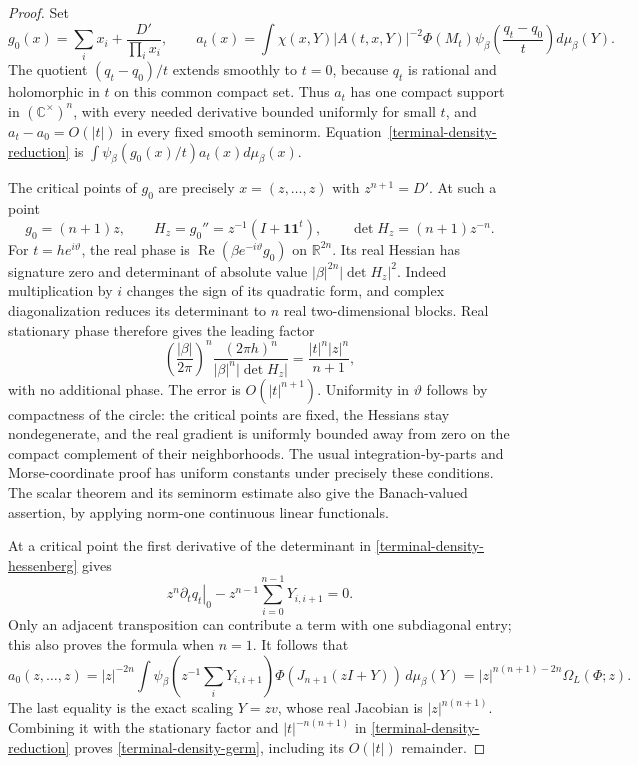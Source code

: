 \begin{proof}
Set
\[
 g_0(x)=\sum_i x_i+\frac{D'}{\prod_i x_i},\qquad
 a_t(x)=\int \chi(x,Y)|A(t,x,Y)|^{-2}\Phi(M_t)
          \psi_\beta\left(\frac{q_t-q_0}{t}\right)d\mu_\beta(Y).
\]
The quotient $(q_t-q_0)/t$ extends smoothly to $t=0$, because
$q_t$ is rational and holomorphic in $t$ on this common compact
set.  Thus $a_t$ has one compact support in $(\mathbb C^\times)^n$,
with every needed derivative bounded uniformly for small $t$,
and $a_t-a_0=O(|t|)$ in every fixed smooth seminorm.
Equation~\eqref{terminal-density-reduction} is
$\int\psi_\beta(g_0(x)/t)a_t(x)d\mu_\beta(x)$.

The critical points of $g_0$ are precisely $x=(z,\ldots,z)$ with
$z^{n+1}=D'$.  At such a point
\[
 g_0=(n+1)z,\qquad H_z=g_0''=z^{-1}(I+\boldsymbol1\boldsymbol1^t),
 \qquad\det H_z=(n+1)z^{-n}.
\]
For $t=he^{i\vartheta}$, the real phase is
$\operatorname{Re}(\beta e^{-i\vartheta}g_0)$ on $\mathbb R^{2n}$.
Its real Hessian has signature zero and determinant of absolute
value $|\beta|^{2n}|\det H_z|^2$.  Indeed multiplication by $i$
changes the sign of its quadratic form, and complex diagonalization
reduces its determinant to $n$ real two-dimensional blocks.
Real stationary phase therefore gives the leading factor
\[
 \left(\frac{|\beta|}{2\pi}\right)^n
 \frac{(2\pi h)^n}{|\beta|^n|\det H_z|}
                    =\frac{|t|^n|z|^n}{n+1},
\]
with no additional phase.  The error is $O(|t|^{n+1})$.
Uniformity in $\vartheta$ follows by compactness of the circle:
the critical points are fixed, the Hessians stay nondegenerate,
and the real gradient is uniformly bounded away from zero on
the compact complement of their neighborhoods.  The usual
integration-by-parts and Morse-coordinate proof has uniform
constants under precisely these conditions.  The scalar theorem
and its seminorm estimate also give the Banach-valued assertion,
by applying norm-one continuous linear functionals.\cite{terminal-density-stationary-phase}

At a critical point the first derivative of the determinant in
\eqref{terminal-density-hessenberg} gives
\[
 z^n\left.\partial_tq_t\right|_0
          -z^{n-1}\sum_{i=0}^{n-1}Y_{i,i+1}=0.
\]
Only an adjacent transposition can contribute a term with one
subdiagonal entry; this also proves the formula when $n=1$.
It follows that
\[
 a_0(z,\ldots,z)=|z|^{-2n}
    \int\psi_\beta\left(z^{-1}\sum_iY_{i,i+1}\right)
                  \Phi(J_{n+1}(zI+Y))\,d\mu_\beta(Y)
                =|z|^{n(n+1)-2n}\Omega_L(\Phi;z).
\]
The last equality is the exact scaling $Y=zv$, whose real
Jacobian is $|z|^{n(n+1)}$.  Combining it with the stationary
factor and $|t|^{-n(n+1)}$ in
\eqref{terminal-density-reduction} proves
\eqref{terminal-density-germ}, including its $O(|t|)$ remainder.
\end{proof}

